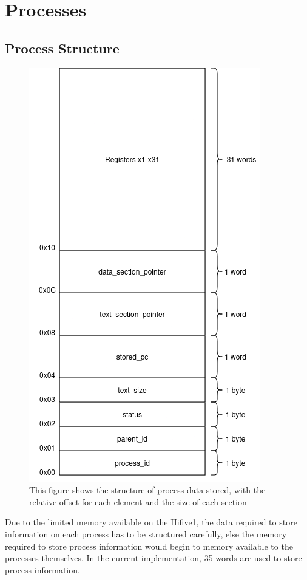 \section{Processes}
\subsection{Process Structure}
\begin{figure}[H]
    \includegraphics[height=0.6\textheight]{figures/process_structure.png}
    \centering
    \caption[Process Structure]{This figure shows the structure of process data stored, with the relative offset for each element and the size of each section}
    \label{fig:proc_struc}
\end{figure}
Due to the limited memory available on the Hifive1, the data required to store information on each process has to be structured carefully, else the memory required to store process information would begin to memory available to the processes themselves. In the current implementation, 35 words are used to store process information.
